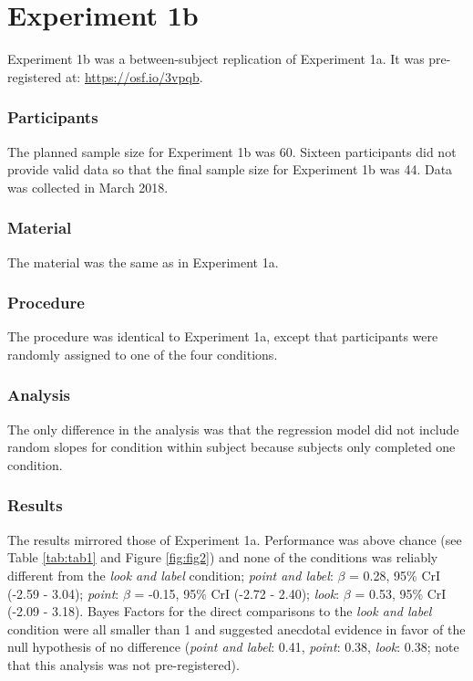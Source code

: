 \documentclass[
  man,floatsintext]{apa6}
\begin{document}
\hypertarget{experiment-1b}{%
\section{Experiment 1b}\label{experiment-1b}}

Experiment 1b was a between-subject replication of Experiment 1a. It was pre-registered at: \url{https://osf.io/3vpqb}.

\hypertarget{participants-1}{%
\subsubsection{Participants}\label{participants-1}}

The planned sample size for Experiment 1b was 60. Sixteen participants did not provide valid data so that the final sample size for Experiment 1b was 44. Data was collected in March 2018.

\hypertarget{material-1}{%
\subsubsection{Material}\label{material-1}}

The material was the same as in Experiment 1a.

\hypertarget{procedure-1}{%
\subsubsection{Procedure}\label{procedure-1}}

The procedure was identical to Experiment 1a, except that participants were randomly assigned to one of the four conditions.

\hypertarget{analysis-1}{%
\subsubsection{Analysis}\label{analysis-1}}

The only difference in the analysis was that the regression model did not include random slopes for condition within subject because subjects only completed one condition.

\hypertarget{results-1}{%
\subsubsection{Results}\label{results-1}}

The results mirrored those of Experiment 1a. Performance was above chance (see Table \ref{tab:tab1} and Figure \ref{fig:fig2}) and none of the conditions was reliably different from the \emph{look and label} condition; \emph{point and label}: \(\beta\) = 0.28, 95\% CrI (-2.59 - 3.04); \emph{point}: \(\beta\) = -0.15, 95\% CrI (-2.72 - 2.40); \emph{look}: \(\beta\) = 0.53, 95\% CrI (-2.09 - 3.18). Bayes Factors for the direct comparisons to the \emph{look and label} condition were all smaller than 1 and suggested anecdotal evidence in favor of the null hypothesis of no difference (\emph{point and label}: 0.41, \emph{point}: 0.38, \emph{look}: 0.38; note that this analysis was not pre-registered).
\end{document}
